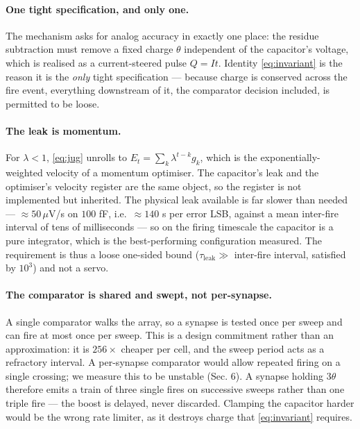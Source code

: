 \documentclass[11pt]{article}
\begin{document}
\hypertarget{one-tight-specification-and-only-one.}{%
\paragraph{One tight specification, and only
one.}\label{one-tight-specification-and-only-one.}}

The mechanism asks for analog accuracy in exactly one place: the residue
subtraction must remove a fixed charge \(\theta\) independent of the
capacitor's voltage, which is realised as a current-steered pulse
\(Q = It\). Identity \eqref{eq:invariant} is the reason it is the \emph{only} tight
specification --- because charge is conserved across the fire event,
everything downstream of it, the comparator decision included, is
permitted to be loose.

\hypertarget{the-leak-is-momentum.}{%
\paragraph{The leak is momentum.}\label{the-leak-is-momentum.}}

For \(\lambda < 1\), \eqref{eq:jug} unrolls to \(E_t = \sum_k \lambda^{t-k} g_k\),
which is the exponentially-weighted velocity of a momentum optimiser.
The capacitor's leak and the optimiser's velocity register are the same
object, so the register is not implemented but inherited. The physical
leak available is far slower than needed --- \(\approx 50\,\mu\)V/s on
\(100\) fF, i.e.~\(\approx 140\) s per error LSB, against a mean
inter-fire interval of tens of milliseconds --- so on the firing
timescale the capacitor is a pure integrator, which is the
best-performing configuration measured. The requirement is thus a loose
one-sided bound (\(\tau_{\text{leak}} \gg\) inter-fire interval,
satisfied by \(10^3\)) and not a servo.

\hypertarget{the-comparator-is-shared-and-swept-not-per-synapse.}{%
\paragraph{The comparator is shared and swept, not
per-synapse.}\label{the-comparator-is-shared-and-swept-not-per-synapse.}}

A single comparator walks the array, so a synapse is tested once per
sweep and can fire at most once per sweep. This is a design commitment
rather than an approximation: it is \(256\times\) cheaper per cell, and
the sweep period acts as a refractory interval. A per-synapse comparator
would allow repeated firing on a single crossing; we measure this to be
unstable (Sec. 6). A synapse holding \(3\theta\) therefore emits a train
of three single fires on successive sweeps rather than one triple fire
--- the boost is delayed, never discarded. Clamping the capacitor harder
would be the wrong rate limiter, as it destroys charge that \eqref{eq:invariant}
requires.
\end{document}
